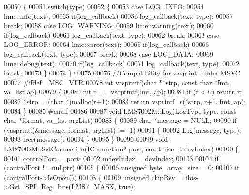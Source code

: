 \begin{DoxyCode}
00050 \{
00051     \textcolor{keywordflow}{switch}(type)
00052     \{
00053     \textcolor{keywordflow}{case} LOG\_INFO:
00054         lime::info(text);
00055         \textcolor{keywordflow}{if}(log\_callback)
00056             log\_callback(text, type);
00057         \textcolor{keywordflow}{break};
00058     \textcolor{keywordflow}{case} LOG\_WARNING:
00059         lime::warning(text);
00060         \textcolor{keywordflow}{if}(log\_callback)
00061             log\_callback(text, type);
00062         \textcolor{keywordflow}{break};
00063     \textcolor{keywordflow}{case} LOG\_ERROR:
00064         lime::error(text);
00065         \textcolor{keywordflow}{if}(log\_callback)
00066             log\_callback(text, type);
00067         \textcolor{keywordflow}{break};
00068     \textcolor{keywordflow}{case} LOG\_DATA:
00069         lime::debug(text);
00070         \textcolor{keywordflow}{if}(log\_callback)
00071             log\_callback(text, type);
00072         \textcolor{keywordflow}{break};
00073     \}
00074 \}
00075 
00076 \textcolor{comment}{//Compatibility for vasprintf under MSVC}
00077 \textcolor{preprocessor}{#ifdef \_MSC\_VER}
00078 \textcolor{keywordtype}{int} vasprintf(\textcolor{keywordtype}{char} **strp, \textcolor{keyword}{const} \textcolor{keywordtype}{char} *fmt, va\_list ap)
00079 \{
00080     \textcolor{keywordtype}{int} r = \_vscprintf(fmt, ap);
00081     \textcolor{keywordflow}{if} (r < 0) \textcolor{keywordflow}{return} r;
00082     *strp = (\textcolor{keywordtype}{char} *)malloc(r+1);
00083     \textcolor{keywordflow}{return} vsprintf\_s(*strp, r+1, fmt, ap);
00084 \}
00085 \textcolor{preprocessor}{#endif}
00086 
00087 \textcolor{keywordtype}{void} LMS7002M::Log(LogType type, \textcolor{keyword}{const} \textcolor{keywordtype}{char} *format, va\_list argList)
00088 \{
00089     \textcolor{keywordtype}{char} *message = NULL;
00090     \textcolor{keywordflow}{if} (vasprintf(&message, format, argList) != -1)
00091     \{
00092         Log(message, type);
00093         free(message);
00094     \}
00095 \}
00096 
00099 \textcolor{keywordtype}{void} LMS7002M::SetConnection(IConnection* port, \textcolor{keyword}{const} \textcolor{keywordtype}{size\_t} devIndex)
00100 \{
00101     controlPort = port;
00102     mdevIndex = devIndex;
00103 
00104     \textcolor{keywordflow}{if} (controlPort != \textcolor{keyword}{nullptr})
00105     \{
00106         \textcolor{keywordtype}{unsigned} byte\_array\_size = 0;
00107         \textcolor{keywordflow}{if} (controlPort->IsOpen())
00108         \{
00109             \textcolor{keywordtype}{unsigned} chipRev = this->Get_SPI_Reg_bits(LMS7_MASK, \textcolor{keyword}{true});

\end{DoxyCode}
